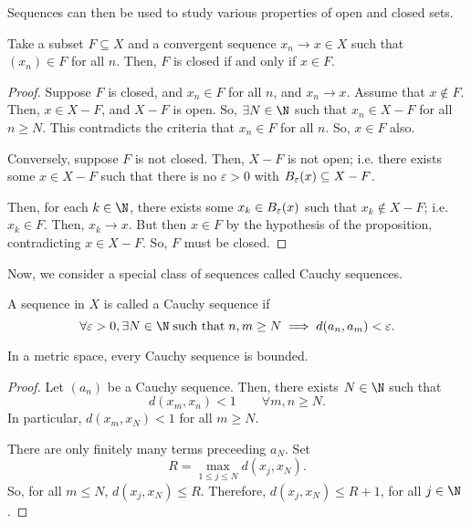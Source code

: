 Sequences can then be used to study various properties of open and closed sets.
\begin{nprop}
  Take a subset $F \subseteq X$ and a convergent sequence $x_n \to x \in X$ such that $(x_n) \in F$ for all $n$. Then, $F$ is closed if and only if $x \in F$.
\end{nprop}
\begin{proof}
  Suppose $F$ is closed, and $x_n \in F$ for all $n$, and $x_n \to x$. Assume that $x \notin F$. Then, $x \in X-F$, and $X-F$ is open. So, $\exists N \in \N$ such that $x_n \in X-F$ for all $n \geq N$. This contradicts the criteria that $x_n \in F$ for all $n$. So, $x \in F$ also.

  Conversely, suppose $F$ is not closed. Then, $X-F$ is not open; i.e. there exists some $x \in X-F$ such that there is no $\varepsilon>0$ with $B_{\varepsilon}(x) \subseteq X - F$.

  Then, for each $k \in \N$, there exists some $x_k \in B_{\varepsilon}(x)$ such that $x_k \notin X-F$; i.e. $x_k \in F$. Then, $x_k \to x$. But then $x \in F$ by the hypothesis of the proposition, contradicting $x \in X-F$. So, $F$ must be closed.
\end{proof}

Now, we consider a special class of sequences called Cauchy sequences.
\begin{ndfn}
  A sequence in $X$ is called a Cauchy sequence if
  \begin{equation*}
  \forall \varepsilon > 0, \exists N \in \N\;\text{such that}\;n,m \geq N \implies d(a_n, a_m) < \varepsilon.
  \end{equation*}
\end{ndfn}

\begin{nthm}
  In a metric space, every Cauchy sequence is bounded.
\end{nthm}
\begin{proof}
  Let $(a_n)$ be a Cauchy sequence. Then, there exists $N \in \N$ such that
  \begin{equation*}
    d(x_m, x_n) < 1 \qquad\forall m,n \geq N.
  \end{equation*}
  In particular, $d(x_m, x_N) < 1$ for all $m \geq N$.

  There are only finitely many terms preceeding $a_N$. Set
  \begin{equation*}
    R = \max_{1 \leq j \leq N} d(x_j, x_N).
  \end{equation*}
  So, for all $m \leq N$, $d(x_j, x_N) \leq R$. Therefore, $d(x_j, x_N) \leq R + 1$, for all $j \in \N$.
\end{proof}

